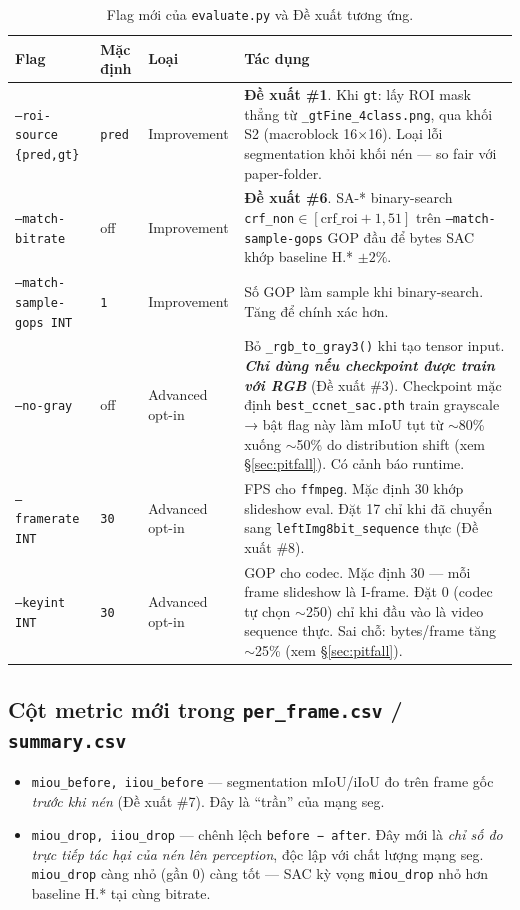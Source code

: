 \documentclass[12pt,a4paper]{article}
\begin{document}
\begin{table}[H]
\centering
\small
\caption{Flag mới của \texttt{evaluate.py} và Đề xuất tương ứng.}
\begin{tabular}{p{3.8cm} p{1.8cm} p{2.3cm} p{6.4cm}}
\toprule
Flag & Mặc định & Loại & Tác dụng \\
\midrule
\texttt{--roi-source \{pred,gt\}} & \texttt{pred} & Improvement &
  \textbf{Đề xuất \#1}. Khi \texttt{gt}: lấy ROI mask thẳng từ
  \texttt{\_gtFine\_4class.png}, qua khối S2 (macroblock 16$\times$16). Loại lỗi
  segmentation khỏi khối nén — so fair với paper-folder. \\
\addlinespace
\texttt{--match-bitrate} & off & Improvement &
  \textbf{Đề xuất \#6}. SA-* binary-search \texttt{crf\_non}$\in[\text{crf\_roi}{+}1,51]$
  trên \texttt{--match-sample-gops} GOP đầu để bytes SAC khớp baseline H.* $\pm 2\%$. \\
\addlinespace
\texttt{--match-sample-gops INT} & \texttt{1} & Improvement &
  Số GOP làm sample khi binary-search. Tăng để chính xác hơn. \\
\midrule
\texttt{--no-gray} & off & Advanced opt-in &
  Bỏ \texttt{\_rgb\_to\_gray3()} khi tạo tensor input. \emph{\textbf{Chỉ dùng nếu
  checkpoint được train với RGB}} (Đề xuất \#3). Checkpoint mặc định
  \texttt{best\_ccnet\_sac.pth} train grayscale → bật flag này làm mIoU tụt từ
  $\sim$80\% xuống $\sim$50\% do distribution shift (xem \S\ref{sec:pitfall}).
  Có cảnh báo runtime. \\
\addlinespace
\texttt{--framerate INT} & \texttt{30} & Advanced opt-in &
  FPS cho \texttt{ffmpeg}. Mặc định 30 khớp slideshow eval. Đặt 17 chỉ khi đã
  chuyển sang \texttt{leftImg8bit\_sequence} thực (Đề xuất \#8). \\
\addlinespace
\texttt{--keyint INT} & \texttt{30} & Advanced opt-in &
  GOP cho codec. Mặc định 30 — mỗi frame slideshow là I-frame. Đặt 0
  (codec tự chọn $\sim$250) chỉ khi đầu vào là video sequence thực. Sai chỗ:
  bytes/frame tăng $\sim$25\% (xem \S\ref{sec:pitfall}). \\
\bottomrule
\end{tabular}
\end{table}

\subsection{Cột metric mới trong \texttt{per\_frame.csv} / \texttt{summary.csv}}

\begin{itemize}[leftmargin=2em]
  \item \texttt{miou\_before, iiou\_before} — segmentation mIoU/iIoU đo trên frame
        gốc \emph{trước khi nén} (Đề xuất \#7). Đây là ``trần'' của mạng seg.
  \item \texttt{miou\_drop, iiou\_drop} — chênh lệch \texttt{before − after}. Đây
        mới là \emph{chỉ số đo trực tiếp tác hại của nén lên perception}, độc lập
        với chất lượng mạng seg. \texttt{miou\_drop} càng nhỏ (gần 0) càng tốt —
        SAC kỳ vọng \texttt{miou\_drop} nhỏ hơn baseline H.* tại cùng bitrate.
\end{itemize}
\end{document}
